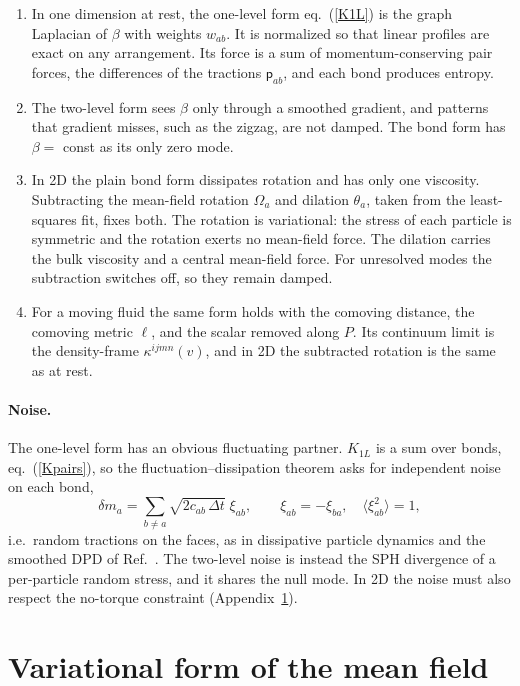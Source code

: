 \documentclass[11pt,aps,preprint,nofootinbib,superscriptaddress,tightenlines]{revtex4-2}
\def\st{\begin{equation}}
\def\stp{\end{equation}}
\def\Eq#1{eq.~(\ref{#1})}
\let\oldparagraph\paragraph
\renewcommand{\paragraph}{\par\bigskip\oldparagraph}
\begin{document}
\begin{enumerate}
\item In one dimension at rest, the one-level form \Eq{K1L} is the graph
  Laplacian of $\beta$ with weights $w_{ab}$.  It is normalized so that
  linear profiles are exact on any arrangement.  Its force is a sum of
  momentum-conserving pair forces, the differences of the tractions $\mathsf p_{ab}$,
  and each bond produces entropy.
\item The two-level form sees $\beta$ only through a smoothed gradient, and
  patterns that gradient misses, such as the zigzag, are not damped.  The
  bond form has $\beta=$ const as its only zero mode.
\item In 2D the plain bond form dissipates rotation and has only one
  viscosity.  Subtracting the mean-field rotation $\Omega_a$ and dilation
  $\theta_a$, taken from the least-squares fit, fixes both.  The rotation is
  variational: the stress of each particle is symmetric and the rotation exerts
  no mean-field force.  The dilation carries the bulk viscosity and a central
  mean-field force.  For unresolved modes the subtraction switches off, so they
  remain damped.
\item For a moving fluid the same form holds with the comoving distance, the
  comoving metric $\ell$, and the scalar removed along $P$.  Its continuum limit
  is the density-frame $\kappa^{ijmn}(v)$, and in 2D the subtracted rotation is
  the same as at rest.
\end{enumerate}

\paragraph{Noise.}  The one-level form has an obvious fluctuating partner.
$K_{1L}$ is a sum over bonds, \Eq{Kpairs}, so the fluctuation--dissipation
theorem asks for independent noise on each bond,
\st
\delta m_a=\sum_{b\neq a}\sqrt{2c_{ab}\,\Delta t}\;\xi_{ab},\qquad
\xi_{ab}=-\xi_{ba},\quad\langle\xi_{ab}^2\rangle=1 ,
\stp
i.e.\ random tractions on the faces, as in dissipative particle dynamics and
the smoothed DPD of Ref.~\cite{EspanolRevenga2003}.  The two-level noise is
instead the SPH divergence of a per-particle random stress, and it shares the
null mode.  In 2D the noise must also respect the no-torque constraint
(Appendix~\ref{app:variational}).


\appendix
\section{Variational form of the mean field}
\label{app:variational}
\end{document}
